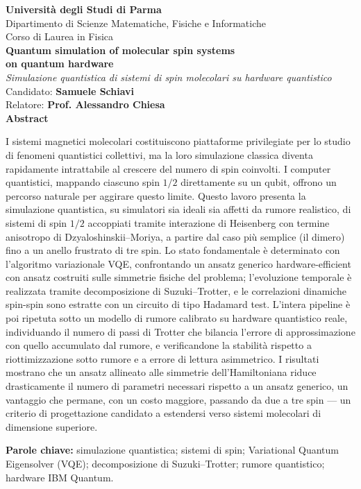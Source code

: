 \documentclass[11pt,a4paper]{article}
\begin{document}
\begin{center}
{\large\bfseries Università degli Studi di Parma}\\[2pt]
{\normalsize Dipartimento di Scienze Matematiche, Fisiche e Informatiche}\\[4pt]
{\normalsize Corso di Laurea in Fisica}\\[18pt]

{\Large\bfseries Quantum simulation of molecular spin systems\\ on quantum hardware}\\[6pt]
{\normalsize\itshape Simulazione quantistica di sistemi di spin molecolari su hardware quantistico}\\[18pt]

{\normalsize Candidato: \textbf{Samuele Schiavi}}\\[4pt]
{\normalsize Relatore: \textbf{Prof. Alessandro Chiesa}}\\[18pt]
{\normalsize\bfseries Abstract}
\end{center}

\vspace{6pt}
\onehalfspacing
\noindent
I sistemi magnetici molecolari costituiscono piattaforme privilegiate per lo
studio di fenomeni quantistici collettivi, ma la loro simulazione classica
diventa rapidamente intrattabile al crescere del numero di spin coinvolti. I
computer quantistici, mappando ciascuno spin $1/2$ direttamente su un qubit,
offrono un percorso naturale per aggirare questo limite. Questo lavoro
presenta la simulazione quantistica, su simulatori sia ideali sia affetti da
rumore realistico, di sistemi di spin $1/2$ accoppiati tramite interazione di
Heisenberg con termine anisotropo di Dzyaloshinskii--Moriya, a partire dal
caso più semplice (il dimero) fino a un anello frustrato di tre spin. Lo
stato fondamentale è determinato con l'algoritmo variazionale VQE,
confrontando un ansatz generico hardware-efficient con ansatz costruiti
sulle simmetrie fisiche del problema; l'evoluzione temporale è realizzata
tramite decomposizione di Suzuki--Trotter, e le correlazioni dinamiche
spin-spin sono estratte con un circuito di tipo Hadamard test. L'intera
pipeline è poi ripetuta sotto un modello di rumore calibrato su hardware
quantistico reale, individuando il numero di passi di Trotter che bilancia
l'errore di approssimazione con quello accumulato dal rumore, e
verificandone la stabilità rispetto a riottimizzazione sotto rumore e a
errore di lettura asimmetrico. I risultati mostrano che un ansatz allineato
alle simmetrie dell'Hamiltoniana riduce drasticamente il numero di parametri
necessari rispetto a un ansatz generico, un vantaggio che permane, con un
costo maggiore, passando da due a tre spin --- un criterio di progettazione
candidato a estendersi verso sistemi molecolari di dimensione superiore.

\vspace{12pt}
\noindent\textbf{Parole chiave:} simulazione quantistica; sistemi di spin;
Variational Quantum Eigensolver (VQE); decomposizione di Suzuki--Trotter;
rumore quantistico; hardware IBM Quantum.
\end{document}

